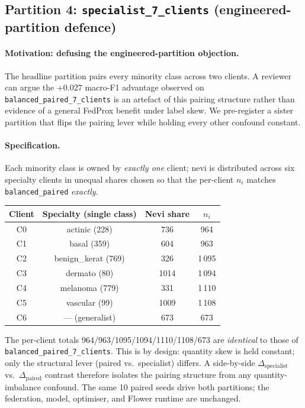 \subsection{Partition 4: \texttt{specialist\_7\_clients}
            (engineered-partition defence)}
\label{sec:stat-het-specialist}

\paragraph{Motivation: defusing the engineered-partition objection.}
The headline partition pairs every minority class across two clients.
A reviewer can argue the +$0.027$ macro-F1 advantage observed on
\texttt{balanced\_paired\_7\_clients} is an artefact of this pairing
structure rather than evidence of a general FedProx benefit under
label skew. We pre-register a sister partition that flips the
pairing lever while holding every other confound constant.

\paragraph{Specification.}
Each minority class is owned by \emph{exactly one} client; nevi
is distributed across six specialty clients in unequal shares
chosen so that the per-client $n_i$ matches
\texttt{balanced\_paired} \emph{exactly}.

\begin{center}
\begin{tabular}{cccc}
\toprule
Client & Specialty (single class) & Nevi share & $n_i$ \\
\midrule
C0 & actinic       (228) & 736  & 964   \\
C1 & basal         (359) & 604  & 963   \\
C2 & benign\_kerat (769) & 326  & 1\,095 \\
C3 & dermato       (80)  & 1014 & 1\,094 \\
C4 & melanoma      (779) & 331  & 1\,110 \\
C5 & vascular      (99)  & 1009 & 1\,108 \\
C6 & --- (generalist)    & 673  & 673   \\
\bottomrule
\end{tabular}
\end{center}

The per-client totals 964/963/1095/1094/1110/1108/673 are
\emph{identical} to those of \texttt{balanced\_paired\_7\_clients}.
This is by design: quantity skew is held constant; only the
structural lever (paired vs.\ specialist) differs. A side-by-side
$\Delta_{\mathrm{specialist}}$ vs.\ $\Delta_{\mathrm{paired}}$
contrast therefore isolates the pairing structure from any
quantity-imbalance confound. The same 10 paired seeds drive both
partitions; the federation, model, optimiser, and Flower runtime
are unchanged.

